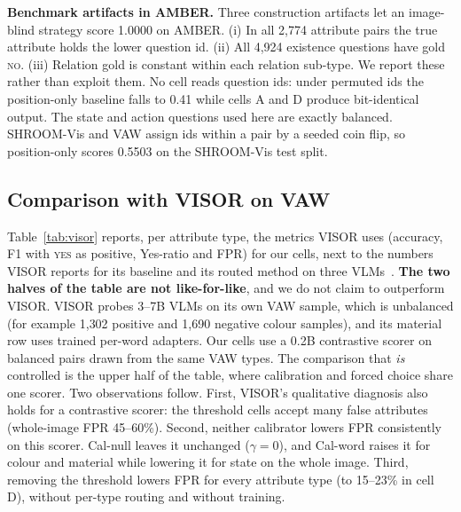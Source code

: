 \documentclass[11pt]{article}
\newcommand{\yes}{\textsc{yes}}
\newcommand{\no}{\textsc{no}}
\begin{document}
\textbf{Benchmark artifacts in AMBER.}\label{sec:artifacts} Three construction artifacts let an image-blind strategy score 1.0000 on AMBER. (i) In all 2{,}774 attribute pairs the true attribute holds the lower question id. (ii) All 4{,}924 existence questions have gold \no. (iii) Relation gold is constant within each relation sub-type. We report these rather than exploit them. No cell reads question ids: under permuted ids the position-only baseline falls to 0.41 while cells A and D produce bit-identical output. The state and action questions used here are exactly balanced. SHROOM-Vis and VAW assign ids within a pair by a seeded coin flip, so position-only scores 0.5503 on the SHROOM-Vis test split.

\subsection{Comparison with VISOR on VAW}\label{sec:visor}
Table~\ref{tab:visor} reports, per attribute type, the metrics VISOR uses (accuracy, F1 with \yes{} as positive, Yes-ratio and FPR) for our cells, next to the numbers VISOR reports for its baseline and its routed method on three VLMs~\cite{zhang2026visor}. \textbf{The two halves of the table are not like-for-like}, and we do not claim to outperform VISOR. VISOR probes 3--7B VLMs on its own VAW sample, which is unbalanced (for example 1{,}302 positive and 1{,}690 negative colour samples), and its material row uses trained per-word adapters. Our cells use a 0.2B contrastive scorer on balanced pairs drawn from the same VAW types. The comparison that \emph{is} controlled is the upper half of the table, where calibration and forced choice share one scorer. Two observations follow. First, VISOR's qualitative diagnosis also holds for a contrastive scorer: the threshold cells accept many false attributes (whole-image FPR 45--60\%). Second, neither calibrator lowers FPR consistently on this scorer. Cal-null leaves it unchanged ($\gamma=0$), and Cal-word raises it for colour and material while lowering it for state on the whole image. Third, removing the threshold lowers FPR for every attribute type (to 15--23\% in cell D), without per-type routing and without training.
\end{document}
